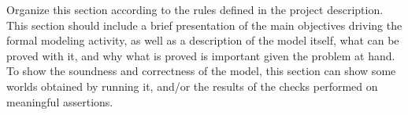 \begin{flushleft}
Organize this section according to the rules defined in the project description. \\

This section should include a brief presentation of the main objectives driving the formal modeling activity, as well as a description of the model itself, what can be proved with it, and why what is proved is important given the problem at hand. To show the soundness and correctness of the model, this section can show some worlds obtained by running it, and/or the results of the checks performed on meaningful assertions.
\end{flushleft}


